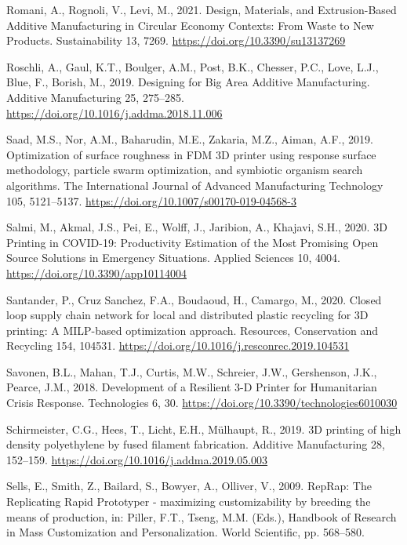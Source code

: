 \documentclass[
  12pt,
  number,
  review]{elsarticle}
\newlength{\cslhangindent}
\newlength{\cslentryspacingunit} %
\newenvironment{CSLReferences}[2] %
 {%
  \setlength{\parindent}{0pt}
  \ifodd #1
  \let\oldpar\par
  \def\par{\hangindent=\cslhangindent\oldpar}
  \fi
  \setlength{\parskip}{#2\cslentryspacingunit}
 }%
 {}
\begin{document}
\begin{CSLReferences}{1}{0}
\leavevmode{}%
Romani, A., Rognoli, V., Levi, M., 2021. Design, {Materials}, and
{Extrusion-Based Additive Manufacturing} in {Circular Economy Contexts}:
{From Waste} to {New Products}. Sustainability 13, 7269.
\url{https://doi.org/10.3390/su13137269}

\leavevmode{}%
Roschli, A., Gaul, K.T., Boulger, A.M., Post, B.K., Chesser, P.C., Love,
L.J., Blue, F., Borish, M., 2019. Designing for {Big Area Additive
Manufacturing}. Additive Manufacturing 25, 275--285.
\url{https://doi.org/10.1016/j.addma.2018.11.006}

\leavevmode{}%
Saad, M.S., Nor, A.M., Baharudin, M.E., Zakaria, M.Z., Aiman, A.F.,
2019. Optimization of surface roughness in {FDM 3D} printer using
response surface methodology, particle swarm optimization, and symbiotic
organism search algorithms. The International Journal of Advanced
Manufacturing Technology 105, 5121--5137.
\url{https://doi.org/10.1007/s00170-019-04568-3}

\leavevmode{}%
Salmi, M., Akmal, J.S., Pei, E., Wolff, J., Jaribion, A., Khajavi, S.H.,
2020. {3D Printing} in {COVID-19}: {Productivity Estimation} of the
{Most Promising Open Source Solutions} in {Emergency Situations}.
Applied Sciences 10, 4004. \url{https://doi.org/10.3390/app10114004}

\leavevmode{}%
Santander, P., Cruz Sanchez, F.A., Boudaoud, H., Camargo, M., 2020.
Closed loop supply chain network for local and distributed plastic
recycling for {3D} printing: A {MILP-based} optimization approach.
Resources, Conservation and Recycling 154, 104531.
\url{https://doi.org/10.1016/j.resconrec.2019.104531}

\leavevmode{}%
Savonen, B.L., Mahan, T.J., Curtis, M.W., Schreier, J.W., Gershenson,
J.K., Pearce, J.M., 2018. Development of a {Resilient} 3-{D Printer} for
{Humanitarian Crisis Response}. Technologies 6, 30.
\url{https://doi.org/10.3390/technologies6010030}

\leavevmode{}%
Schirmeister, C.G., Hees, T., Licht, E.H., Mülhaupt, R., 2019. {3D}
printing of high density polyethylene by fused filament fabrication.
Additive Manufacturing 28, 152--159.
\url{https://doi.org/10.1016/j.addma.2019.05.003}

\leavevmode{}%
Sells, E., Smith, Z., Bailard, S., Bowyer, A., Olliver, V., 2009.
{RepRap}: {The Replicating Rapid Prototyper} - maximizing
customizability by breeding the means of production, in: Piller, F.T.,
Tseng, M.M. (Eds.), Handbook of {Research} in {Mass Customization} and
{Personalization}. {World Scientific}, pp. 568--580.


\end{CSLReferences}
\end{document}
